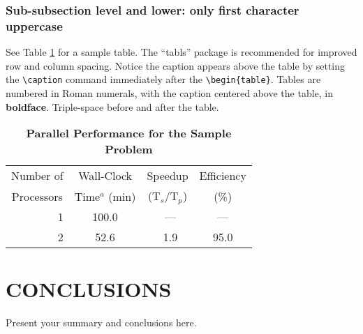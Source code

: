 \documentclass{physor2012}
\begin{document}
\subsubsection{Sub-subsection level and lower: only first character uppercase}
%
See Table \ref{table:example} for a sample table.  The ``tabls'' package is
recommended for improved row and column spacing.  Notice the caption appears 
above the table by setting the \verb!\caption! command immediately 
after the \verb!\begin{table}!. Tables are numbered in Roman 
numerals, with the caption centered above the table, in \textbf{boldface}.  
Triple-space before and after the table.
%
\begin{table}[!htb]
  \centering
  \caption{\bf Parallel Performance for the Sample Problem}
  \label{table:example} 
  \begin{tabular}{||r||c|c|c||} \hline \hline
    \multicolumn{1}{||c||}{Number of} &
    \multicolumn{1}{c|}{Wall-Clock} &
    \multicolumn{1}{c|}{Speedup} &
    \multicolumn{1}{c||}{Efficiency} \\
    \multicolumn{1}{||c||}{Processors} &
    \multicolumn{1}{c|}{Time$^{a}$ (min)} &
    \multicolumn{1}{c|}{(T$_{s}$/T$_{p}$)} &
    \multicolumn{1}{c||}{(\%)} \\ \hline\hline
    \ 1 &  100.0 & \ ---    & ---  \\ \hline
    \ 2 &   52.6 & \ 1.9    & 95.0 \\ \hline \hline
  \end{tabular}
\end{table}
%
\section{CONCLUSIONS}
%
Present your summary and conclusions here.
%
\end{document}
